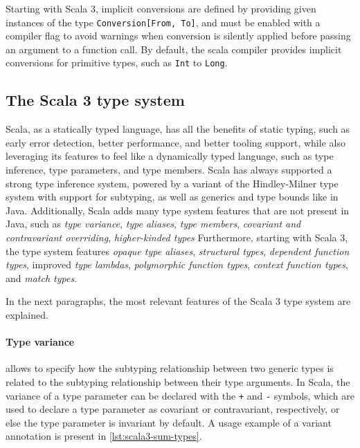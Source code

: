 Starting with Scala 3, implicit conversions are defined by providing given instances of the type \texttt{Conversion[From, To]}, and must be enabled with a compiler flag to avoid warnings when conversion is silently applied before passing an argument to a function call.
%
By default, the scala compiler provides implicit conversions for primitive types, such as \texttt{Int} to \texttt{Long}.


\subsection{The Scala 3 type system} \label{chap:background->sec:scala3->subsec:type-system}

Scala, as a statically typed language, has all the benefits of static typing, such as early error detection, better performance, and better tooling support, while also leveraging its features to feel like a dynamically typed language, such as type inference, type parameters, and type members.
%
Scala has always supported a strong type inference system, powered by a variant of the Hindley-Milner type system with support for subtyping, as well as generics and type bounds like in Java.
%
Additionally, Scala adds many type system features that are not present in Java, such as \textit{type variance}, \textit{type aliases}, \textit{type members}, \textit{covariant and contravariant overriding}, \textit{higher-kinded types}
%
Furthermore, starting with Scala 3, the type system features \textit{opaque type aliases}, \textit{structural types}, \textit{dependent function types}, improved \textit{type lambdas}, \textit{polymorphic function types}, \textit{context function types}, and \textit{match types}.

In the next paragraphs, the most relevant features of the Scala 3 type system are explained.

\paragraph{Type variance} allows to specify how the subtyping relationship between two generic types is related to the subtyping relationship between their type arguments.
%
In Scala, the variance of a type parameter can be declared with the \texttt{+} and \texttt{-} symbols, which are used to declare a type parameter as covariant or contravariant, respectively, or else the type parameter is invariant by default.
%
A usage example of a variant annotation is present in \cref{lst:scala3-sum-types}.

